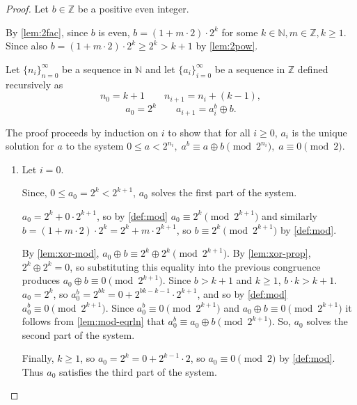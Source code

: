 \documentclass[1gpt]{article}
\theoremstyle{break}
\newcommand{\xor}{\oplus}
\begin{document}
\begin{proof}

    Let $b \in \mathbb{Z}$ be a positive even integer.

    By \ref{lem:2fac}, since $b$ is even, $b = (1 + m \cdot 2) \cdot 2^k$ for
    some $k \in \mathbb{N}, m \in \mathbb{Z}, k \geq 1$. Since also $b = (1 + m
    \cdot 2) \cdot 2^k \geq 2^k > k+1$ by \ref{lem:2pow}.

    Let $\{n_i\}_{n=0}^\infty$ be a sequence in $\mathbb{N}$ and
    let $\{a_i\}_{i=0}^\infty$ be a sequence in $\mathbb{Z}$
    defined recursively as 
    $$ n_0 = k+1 \qquad n_{i+1} = n_i + (k-1), $$
    $$ a_0 = 2^{k} \qquad a_{i+1} = a_i^b \oplus b. $$

    The proof proceeds by induction on $i$ to show that for all $i \geq 0$,
    $a_i$ is the unique solution for $a$ to the system $0 \leq a < 2^{n_i},\;
    a^b \equiv a \oplus b \pmod{2^{n_i}},\; a \equiv 0 \pmod{2}$.

    \begin{enumerate}

        \item

            Let $i = 0$. 

            Since, $0 \leq a_0 = 2^k < 2^{k+1}$, $a_0$ solves the first part of
            the system.

            $a_0 = 2^k + 0 \cdot 2^{k+1}$, so by \ref{def:mod} $a_0 \equiv 2^k
            \pmod{2^{k+1}}$ and similarly $b = (1 + m \cdot 2) \cdot 2^k = 2^k
            + m \cdot 2^{k+1}$, so $b \equiv 2^k \pmod{2^{k+1}}$ by
            \ref{def:mod}.

            By \ref{lem:xor-mod}, $a_0 \xor b \equiv 2^k \xor 2^k
            \pmod{2^{k+1}}$. By \ref{lem:xor-prop}, $2^k \xor 2^k = 0$, so
            substituting this equality into the previous congruence produces
            $a_0 \xor b \equiv 0 \pmod{2^{k+1}}$. Since $b > k + 1$ and $k \geq
            1$, $b \cdot k > k + 1$. $a_0 = 2^k$, so $a_0^b = 2^{bk} = 0 +
            2^{bk-k-1} \cdot 2^{k+1}$, and so by \ref{def:mod} $a_0^b \equiv 0
            \pmod{2^{k+1}}$. Since $a_0^b \equiv 0 \pmod{2^{k+1}}$ and $a_0
            \xor b \equiv 0 \pmod{2^{k+1}}$ it follows from \ref{lem:mod-eqrln}
            that $a_0^b \equiv a_0 \xor b \pmod{2^{k+1}}$. So, $a_0$ solves the
            second part of the system.

            Finally, $k \geq 1$, so $a_0 = 2^k = 0 + 2^{k-1} \cdot 2$, so $a_0
            \equiv{0} \pmod{2}$ by \ref{def:mod}. Thus $a_0$ satisfies the
            third part of the system.


\end{enumerate}
\end{proof}
\end{document}
